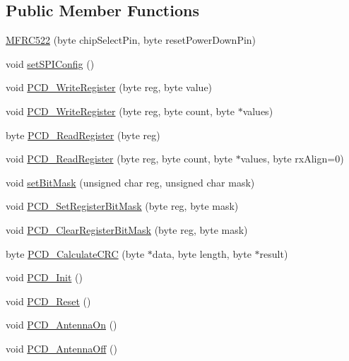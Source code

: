 \subsection*{Public Member Functions}
\begin{DoxyCompactItemize}
\item 
\hyperlink{class_m_f_r_c522_a8b859e244e80970594bf333a0148ade1}{M\+F\+R\+C522} (byte chip\+Select\+Pin, byte reset\+Power\+Down\+Pin)
\item 
void \hyperlink{class_m_f_r_c522_a425d73a02db79e17abd78ff805770fc3}{set\+S\+P\+I\+Config} ()
\item 
void \hyperlink{class_m_f_r_c522_aa97f1faf2a4c82b911d7c3ed2535bb59}{P\+C\+D\+\_\+\+Write\+Register} (byte reg, byte value)
\item 
void \hyperlink{class_m_f_r_c522_a2141779996fc50861aafb89f9d12a163}{P\+C\+D\+\_\+\+Write\+Register} (byte reg, byte count, byte $\ast$values)
\item 
byte \hyperlink{class_m_f_r_c522_a4d81572f8b9ed0ffb1f59270cdffc310}{P\+C\+D\+\_\+\+Read\+Register} (byte reg)
\item 
void \hyperlink{class_m_f_r_c522_ad5960b7bc42a9a3ebfa7ccf390ffc356}{P\+C\+D\+\_\+\+Read\+Register} (byte reg, byte count, byte $\ast$values, byte rx\+Align=0)
\item 
void \hyperlink{class_m_f_r_c522_a5b743b53393d88588e9d878159e89faf}{set\+Bit\+Mask} (unsigned char reg, unsigned char mask)
\item 
void \hyperlink{class_m_f_r_c522_adef7552eb0089496522153e7bad19d63}{P\+C\+D\+\_\+\+Set\+Register\+Bit\+Mask} (byte reg, byte mask)
\item 
void \hyperlink{class_m_f_r_c522_a45d4f1b7cdc9eccd9d394d4f5058c503}{P\+C\+D\+\_\+\+Clear\+Register\+Bit\+Mask} (byte reg, byte mask)
\item 
byte \hyperlink{class_m_f_r_c522_a96adb3a83724709c622cc50d5518cbc3}{P\+C\+D\+\_\+\+Calculate\+C\+RC} (byte $\ast$data, byte length, byte $\ast$result)
\item 
void \hyperlink{class_m_f_r_c522_ad681e424fc68a57941bea5702cee05eb}{P\+C\+D\+\_\+\+Init} ()
\item 
void \hyperlink{class_m_f_r_c522_a9886678ea0a65021bf602cfb110caa15}{P\+C\+D\+\_\+\+Reset} ()
\item 
void \hyperlink{class_m_f_r_c522_a044be037a5f172e9cea7d8ce1dcf32e0}{P\+C\+D\+\_\+\+Antenna\+On} ()
\item 
void \hyperlink{class_m_f_r_c522_a2098ebe85700109b20c5026643f1dad7}{P\+C\+D\+\_\+\+Antenna\+Off} ()

\end{DoxyCompactItemize}
